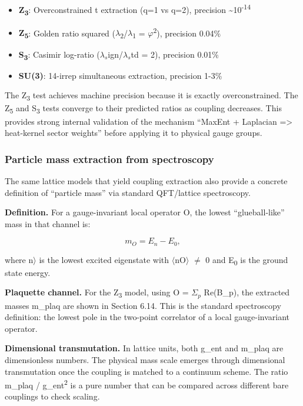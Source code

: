\documentclass[11pt,a4paper]{article}
\theoremstyle{remark}
\providecommand{\tightlist}{%
  \setlength{\itemsep}{0pt}\setlength{\parskip}{0pt}}
\begin{document}
\begin{itemize}
\tightlist
\item
  \textbf{Z\textsubscript{3}}: Overconstrained t extraction (q=1 vs q=2), precision \textasciitilde10\textsuperscript{-14}
\item
  \textbf{Z\textsubscript{5}}: Golden ratio squared (\ensuremath{\lambda}\textsubscript{2}/\ensuremath{\lambda}\textsubscript{1} = \ensuremath{\varphi}\textsuperscript{2}), precision 0.04\%
\item
  \textbf{S\textsubscript{3}}: Casimir log-ratio (\(\lambda{}_s\)ign/\(\lambda{}_s\)td = 2), precision 0.01\%
\item
  \textbf{SU(3)}: 14-irrep simultaneous extraction, precision 1-3\%
\end{itemize}

The Z\textsubscript{3} test achieves machine precision because it is exactly
overconstrained. The Z\textsubscript{5} and S\textsubscript{3} tests converge to their
predicted ratios as coupling decreases. This provides strong internal
validation of the mechanism ``MaxEnt + Laplacian =\textgreater{} heat-kernel
sector weights'' before applying it to physical gauge groups.

\subsubsection{Particle mass extraction from spectroscopy}\label{particle-mass-extraction-from-spectroscopy}

The same lattice models that yield coupling extraction also provide a concrete
definition of ``particle mass'' via standard QFT/lattice spectroscopy.

\textbf{Definition.} For a gauge-invariant local operator O, the lowest
``glueball-like'' mass in that channel is:

\[
m_O = E_n - E_0,
\]

where \textbar n\ensuremath{\rangle} is the lowest excited eigenstate with \ensuremath{\langle}n\textbar O\ensuremath{\rangle} \ensuremath{\neq} 0
and E\textsubscript{0} is the ground state energy.

\textbf{Plaquette channel.} For the Z\textsubscript{3} model, using
O = \(\Sigma_p\) Re(B\_p), the extracted masses m\_plaq are
shown in Section 6.14. This is the standard spectroscopy definition: the lowest
pole in the two-point correlator of a local gauge-invariant operator.

\textbf{Dimensional transmutation.} In lattice units, both g\_ent and
m\_plaq are dimensionless numbers. The physical mass scale emerges
through dimensional transmutation once the coupling is matched to a continuum
scheme. The ratio m\_plaq / g\_ent\textsuperscript{2} is a pure number
that can be compared across different bare couplings to check scaling.
\end{document}
